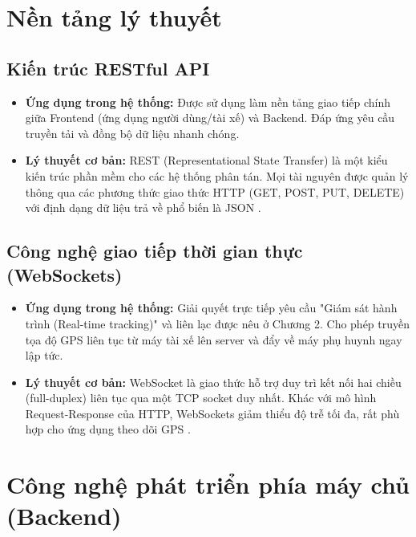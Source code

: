 \documentclass[../DoAn.tex]{subfiles}
\begin{document}
\section{Nền tảng lý thuyết}

\subsection{Kiến trúc RESTful API}
\begin{itemize}
    \item \textbf{Ứng dụng trong hệ thống:} Được sử dụng làm nền tảng giao tiếp chính giữa Frontend (ứng dụng người dùng/tài xế) và Backend. Đáp ứng yêu cầu truyền tải và đồng bộ dữ liệu nhanh chóng.
    \item \textbf{Lý thuyết cơ bản:} REST (Representational State Transfer) là một kiểu kiến trúc phần mềm cho các hệ thống phân tán. Mọi tài nguyên được quản lý thông qua các phương thức giao thức HTTP (GET, POST, PUT, DELETE) với định dạng dữ liệu trả về phổ biến là JSON \cite{REST_Reference}.
\end{itemize}

\subsection{Công nghệ giao tiếp thời gian thực (WebSockets)}
\begin{itemize}
    \item \textbf{Ứng dụng trong hệ thống:} Giải quyết trực tiếp yêu cầu "Giám sát hành trình (Real-time tracking)" và liên lạc được nêu ở Chương 2. Cho phép truyền tọa độ GPS liên tục từ máy tài xế lên server và đẩy về máy phụ huynh ngay lập tức.
    \item \textbf{Lý thuyết cơ bản:} WebSocket là giao thức hỗ trợ duy trì kết nối hai chiều (full-duplex) liên tục qua một TCP socket duy nhất. Khác với mô hình Request-Response của HTTP, WebSockets giảm thiểu độ trễ tối đa, rất phù hợp cho ứng dụng theo dõi GPS \cite{WebSocket_Reference}.
\end{itemize}

\section{Công nghệ phát triển phía máy chủ (Backend)}
\end{document}
